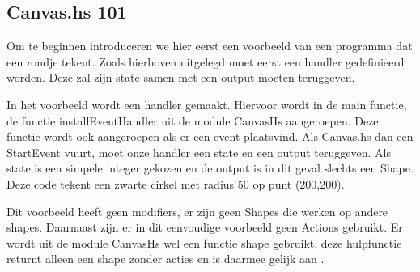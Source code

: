 \subsection{Canvas.hs 101}
Om te beginnen introduceren we hier eerst een voorbeeld van een programma dat een rondje tekent. Zoals hierboven uitgelegd moet eerst een handler gedefinieerd worden. Deze zal zijn state samen met een output moeten teruggeven.



In het voorbeeld wordt een handler gemaakt. Hiervoor wordt in de main functie, de functie installEventHandler uit de module CanvasHs aangeroepen. Deze functie wordt ook aangeroepen als er een event plaatsvind. Als Canvas.hs dan een StartEvent vuurt, moet onze handler een state en een output teruggeven. Als state is een simpele integer gekozen en de output is in dit geval slechts een Shape. Deze code tekent een zwarte cirkel met radius 50 op punt (200,200).

Dit voorbeeld heeft geen modifiers, er zijn geen Shapes die werken op andere shapes. Daarnaast zijn er in dit eenvoudige voorbeeld geen Actions gebruikt. Er wordt uit de module CanvasHs wel een functie shape gebruikt, deze hulpfunctie returnt alleen een shape zonder acties en is daarmee gelijk aan .
